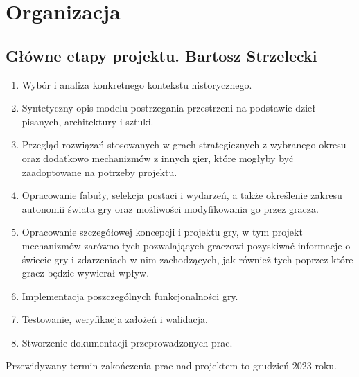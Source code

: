 \chapter{Organizacja}
\section{Główne etapy projektu. Bartosz Strzelecki}
\begin{enumerate}
  \item Wybór i analiza konkretnego kontekstu historycznego.
  \item Syntetyczny opis modelu postrzegania przestrzeni na podstawie dzieł pisanych, architektury i sztuki.
  \item Przegląd rozwiązań stosowanych w grach strategicznych z wybranego okresu oraz dodatkowo mechanizmów z innych gier, które mogłyby być zaadoptowane na potrzeby projektu.
  \item Opracowanie fabuły, selekcja postaci i wydarzeń, a także określenie zakresu autonomii świata gry oraz możliwości modyfikowania go przez gracza.
  \item Opracowanie szczegółowej koncepcji i projektu gry, w tym projekt mechanizmów zarówno tych pozwalających graczowi pozyskiwać informacje o świecie gry i zdarzeniach w nim zachodzących, jak również tych poprzez które gracz będzie wywierał wpływ.
  \item Implementacja poszczególnych funkcjonalności gry.
  \item Testowanie, weryfikacja założeń i walidacja.
  \item Stworzenie dokumentacji przeprowadzonych prac.
\end{enumerate}
Przewidywany termin zakończenia prac nad projektem to grudzień 2023 roku.
